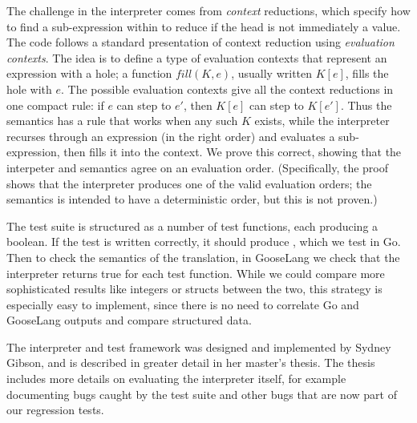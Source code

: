 The challenge in the interpreter comes from \emph{context} reductions,
which specify how to find a sub-expression within  to reduce
if the head is not immediately a value. The code follows a standard
presentation of context reduction using \emph{evaluation contexts}. The
idea is to define a type of evaluation contexts  that
represent an expression with a hole; a function $fill(K, e)$, usually
written $K[e]$, fills the hole with $e$. The possible evaluation
contexts give all the context reductions in one compact rule: if $e$
can step to $e'$, then $K[e]$ can step to $K[e']$. Thus the
semantics has a rule that works when any such $K$ exists, while the
interpreter recurses through an expression (in the right order) and
evaluates a sub-expression, then fills it into the context. We prove
this correct, showing that the interpeter and semantics agree on an
evaluation order. (Specifically, the proof shows that the interpreter
produces one of the valid evaluation orders; the semantics is intended
to have a deterministic order, but this is not proven.)

The test suite is structured as a number of test functions, each
producing a boolean. If the test is written correctly, it should produce
, which we test in Go. Then to check the semantics of the
translation, in GooseLang we check that the interpreter returns true for
each test function. While we could compare more sophisticated results
like integers or structs between the two, this strategy is especially
easy to implement, since there is no need to correlate Go and GooseLang
outputs and compare structured data.

The interpreter and test framework was designed and implemented by
Sydney Gibson, and is described in greater detail in her master's
thesis. The thesis includes more details on evaluating the interpreter
itself, for example documenting bugs caught by the test suite and other
bugs that are now part of our regression tests.
